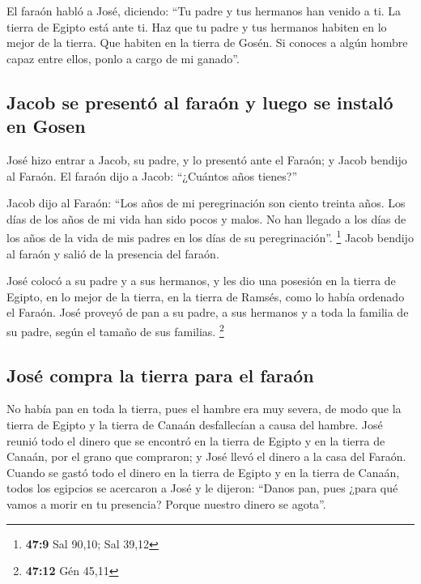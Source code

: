  El faraón habló a José, diciendo: ``Tu padre y tus
hermanos han venido a ti.  La tierra de Egipto está ante
ti. Haz que tu padre y tus hermanos habiten en lo mejor de la tierra.
Que habiten en la tierra de Gosén. Si conoces a algún hombre capaz entre
ellos, ponlo a cargo de mi ganado''.

\hypertarget{jacob-se-presentuxf3-al-farauxf3n-y-luego-se-instaluxf3-en-gosen}{%
\subsection{Jacob se presentó al faraón y luego se instaló en
Gosen}\label{jacob-se-presentuxf3-al-farauxf3n-y-luego-se-instaluxf3-en-gosen}}

 José hizo entrar a Jacob, su padre, y lo presentó ante el
Faraón; y Jacob bendijo al Faraón.  El faraón dijo a
Jacob: ``¿Cuántos años tienes?''

 Jacob dijo al Faraón: ``Los años de mi peregrinación son
ciento treinta años. Los días de los años de mi vida han sido pocos y
malos. No han llegado a los días de los años de la vida de mis padres en
los días de su peregrinación''. \footnote{\textbf{47:9} Sal 90,10; Sal
  39,12}  Jacob bendijo al faraón y salió de la presencia
del faraón.

 José colocó a su padre y a sus hermanos, y les dio una
posesión en la tierra de Egipto, en lo mejor de la tierra, en la tierra
de Ramsés, como lo había ordenado el Faraón.  José
proveyó de pan a su padre, a sus hermanos y a toda la familia de su
padre, según el tamaño de sus familias. \footnote{\textbf{47:12} Gén
  45,11}

\hypertarget{josuxe9-compra-la-tierra-para-el-farauxf3n}{%
\subsection{José compra la tierra para el
faraón}\label{josuxe9-compra-la-tierra-para-el-farauxf3n}}

 No había pan en toda la tierra, pues el hambre era muy
severa, de modo que la tierra de Egipto y la tierra de Canaán
desfallecían a causa del hambre.  José reunió todo el
dinero que se encontró en la tierra de Egipto y en la tierra de Canaán,
por el grano que compraron; y José llevó el dinero a la casa del Faraón.
 Cuando se gastó todo el dinero en la tierra de Egipto y
en la tierra de Canaán, todos los egipcios se acercaron a José y le
dijeron: ``Danos pan, pues ¿para qué vamos a morir en tu presencia?
Porque nuestro dinero se agota''.

